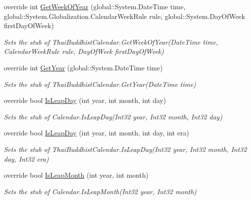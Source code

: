 \begin{DoxyCompactItemize}
override int \hyperlink{class_system_1_1_globalization_1_1_fakes_1_1_stub_thai_buddhist_calendar_a3c87fdd2e524a75a118c1238b07d1534}{Get\-Week\-Of\-Year} (global\-::\-System.\-Date\-Time time, global\-::\-System.\-Globalization.\-Calendar\-Week\-Rule rule, global\-::\-System.\-Day\-Of\-Week first\-Day\-Of\-Week)
\begin{DoxyCompactList}\small\item\em Sets the stub of Thai\-Buddhist\-Calendar.\-Get\-Week\-Of\-Year(\-Date\-Time time, Calendar\-Week\-Rule rule, Day\-Of\-Week first\-Day\-Of\-Week)\end{DoxyCompactList}\item 
override int \hyperlink{class_system_1_1_globalization_1_1_fakes_1_1_stub_thai_buddhist_calendar_afe926b72d575902b53586cb6a58f4450}{Get\-Year} (global\-::\-System.\-Date\-Time time)
\begin{DoxyCompactList}\small\item\em Sets the stub of Thai\-Buddhist\-Calendar.\-Get\-Year(\-Date\-Time time)\end{DoxyCompactList}\item 
override bool \hyperlink{class_system_1_1_globalization_1_1_fakes_1_1_stub_thai_buddhist_calendar_afa5d7d86aeb276051013de2bed6c7bd7}{Is\-Leap\-Day} (int year, int month, int day)
\begin{DoxyCompactList}\small\item\em Sets the stub of Calendar.\-Is\-Leap\-Day(\-Int32 year, Int32 month, Int32 day)\end{DoxyCompactList}\item 
override bool \hyperlink{class_system_1_1_globalization_1_1_fakes_1_1_stub_thai_buddhist_calendar_aa53c88ec5245f47bb5a80771519c8213}{Is\-Leap\-Day} (int year, int month, int day, int era)
\begin{DoxyCompactList}\small\item\em Sets the stub of Thai\-Buddhist\-Calendar.\-Is\-Leap\-Day(\-Int32 year, Int32 month, Int32 day, Int32 era)\end{DoxyCompactList}\item 
override bool \hyperlink{class_system_1_1_globalization_1_1_fakes_1_1_stub_thai_buddhist_calendar_ac5d4331f18db15b15d1145c8874e26cf}{Is\-Leap\-Month} (int year, int month)
\begin{DoxyCompactList}\small\item\em Sets the stub of Calendar.\-Is\-Leap\-Month(\-Int32 year, Int32 month)\end{DoxyCompactList}\item 

\end{DoxyCompactItemize}

